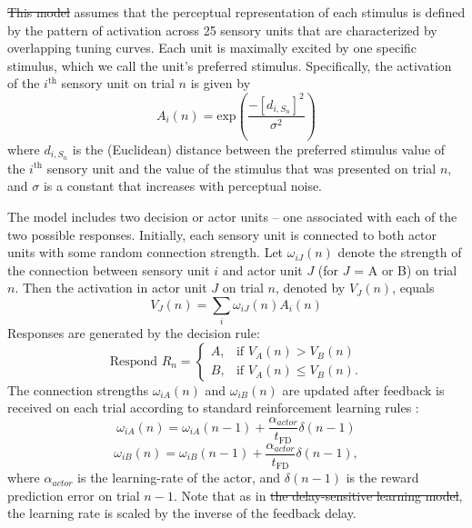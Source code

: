\documentclass[doc, floatsintext]{apa7}
\providecommand{\DIFadd}[1]{{\protect\color{blue}\uwave{#1}}} %
\providecommand{\DIFdel}[1]{{\protect\color{red}\sout{#1}}}                      %
\providecommand{\DIFaddbegin}{} %
\providecommand{\DIFaddend}{} %
\providecommand{\DIFdelbegin}{} %
\providecommand{\DIFdelend}{} %
\newcommand{\DIFscaledelfig}{0.5}
\newlength{\DIFdelgraphicswidth} %
\newlength{\DIFdelgraphicsheight} %
\newcommand{\DIFaddincludegraphics}[2][]{{\color{blue}\fbox{\DIFOincludegraphics[#1]{#2}}}} %
\newcommand{\DIFdelincludegraphics}[2][]{%
\sbox{\DIFdelgraphicsbox}{\DIFOincludegraphics[#1]{#2}}%
\settoboxwidth{\DIFdelgraphicswidth}{\DIFdelgraphicsbox} %
\settoboxtotalheight{\DIFdelgraphicsheight}{\DIFdelgraphicsbox} %
\scalebox{\DIFscaledelfig}{%
\parbox[b]{\DIFdelgraphicswidth}{\usebox{\DIFdelgraphicsbox}\\[-\baselineskip] \rule{\DIFdelgraphicswidth}{0em}}\llap{\resizebox{\DIFdelgraphicswidth}{\DIFdelgraphicsheight}{%
\setlength{\unitlength}{\DIFdelgraphicswidth}%
\begin{picture}(1,1)%
\thicklines\linethickness{2pt} %
{\color[rgb]{1,0,0}\put(0,0){\framebox(1,1){}}}%
{\color[rgb]{1,0,0}\put(0,0){\line( 1,1){1}}}%
{\color[rgb]{1,0,0}\put(0,1){\line(1,-1){1}}}%
\end{picture}%
}\hspace*{3pt}}} %
} %
\DeclareRobustCommand{\DIFaddbegin}{\DIFOaddbegin \let\includegraphics\DIFaddincludegraphics} %
\DeclareRobustCommand{\DIFaddend}{\DIFOaddend \let\includegraphics\DIFOincludegraphics} %
\DeclareRobustCommand{\DIFdelbegin}{\DIFOdelbegin \let\includegraphics\DIFdelincludegraphics} %
\DeclareRobustCommand{\DIFdelend}{\DIFOaddend \let\includegraphics\DIFOincludegraphics} %
\begin{document}
\DIFdel{This model }\DIFdelend \DIFaddbegin \DIFadd{These models
}\DIFaddend assumes that the perceptual representation of each stimulus
is defined by the pattern of activation across 25 sensory
units that are characterized by overlapping tuning curves.
Each unit is maximally excited by one specific stimulus,
which we call the unit's preferred stimulus. Specifically,
the activation of the $i^\text{th}$ sensory unit on trial
$n$ is given by
\begin{equation}
  A_i(n) = \text{exp} \left( \frac{-\left[d_{i,S_n}\right]^2}{\sigma^2} \right)
  \DIFaddbegin \label{eq:DSL_activation}
\DIFaddend \end{equation}
where $d_{i,S_n}$ is the (Euclidean) distance between the preferred
stimulus value of the $i^\text{th}$ sensory unit and the
value of the stimulus that was presented on trial $n$, and
$\sigma$ is a constant that increases with perceptual noise.

The model includes two decision or actor units -- one
associated with each of the two possible responses.
Initially, each sensory unit is connected to both actor
units with some random connection strength. Let
$\omega_{iJ}(n)$ denote the strength of the connection
between sensory unit $i$ and actor unit $J$ (for $J$ = A or
B) on trial $n$. Then the activation in actor unit $J$ on
trial $n$, denoted by $V_J(n)$, equals
\begin{equation}
  V_J(n) = \sum_{i} \omega_{iJ}(n) A_i(n)
\end{equation}
Responses are generated by the decision rule:
\begin{equation}
 \text{Respond } R_n =
  \begin{cases}
    A, & \text{if $V_A(n) > V_B(n)$}\\
    B, & \text{if $V_A(n) \leq V_B(n).$}
  \end{cases}
\end{equation}
The connection strengths $\omega_{iA}(n)$ and
$\omega_{iB}(n)$ are updated after feedback is received on
each trial according to standard reinforcement learning
rules \parencite{SuttonBarto1998}:
\begin{equation}
  \omega_{iA}(n) = \omega_{iA}(n-1) + \frac{\alpha_{actor}}{t_\text{FD}} \delta(n-1)
\end{equation}
\begin{equation}
  \omega_{iB}(n) = \omega_{iB}(n-1) + \frac{\alpha_{actor}}{t_\text{FD}} \delta(n-1),
\end{equation}
where $\alpha_{actor}$ is the learning-rate of the actor, and
$\delta(n-1)$ is the reward prediction error on trial $n-1$.
Note that as in \DIFdelbegin \DIFdel{the delay-sensitive learning model}\DIFdelend \DIFaddbegin \DIFadd{Equation~\ref{RL}}\DIFaddend , the learning rate is
scaled by the inverse of the feedback delay. 
\DIFaddbegin 
\end{document}
